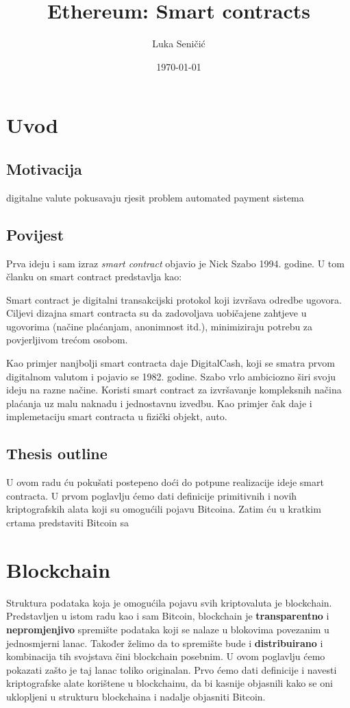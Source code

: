 \documentclass[12pt]{report}
\title{Ethereum: Smart contracts}
\author{Luka Seničić}
\date{\today}
\begin{document}
\maketitle

\tableofcontents

\chapter{Uvod}
\section{Motivacija}
digitalne valute pokusavaju rjesit problem automated payment sistema

\section{Povijest}
Prva ideju i sam izraz \emph{smart contract} objavio je Nick Szabo 1994. godine\cite{smart_contract_idea}. U tom članku on smart contract predstavlja kao:
\begin{definicija}
Smart contract je digitalni transakcijski protokol koji izvršava odredbe ugovora. Ciljevi dizajna smart contracta su da zadovoljava uobičajene zahtjeve u ugovorima (načine plaćanjam, anonimnost itd.), minimiziraju potrebu za povjerljivom trećom osobom.
\end{definicija}
Kao primjer nanjbolji smart contracta daje DigitalCash, koji se smatra prvom digitalnom valutom i pojavio se 1982. godine\cite{digi_cash}. Szabo vrlo ambiciozno širi svoju ideju na razne načine. Koristi smart contract za izvršavanje kompleksnih načina plaćanja uz malu naknadu i jednostavnu izvedbu. Kao primjer čak daje i implemetaciju smart contracta u fizički objekt, auto.

\section{Thesis outline}

U ovom radu ću pokušati postepeno doći do potpune realizacije ideje smart contracta. U prvom poglavlju ćemo dati definicije primitivnih i novih kriptografskih alata koji su omogućili pojavu Bitcoina. Zatim ću u kratkim crtama predstaviti Bitcoin sa 

\chapter{Blockchain}
Struktura podataka koja je omogućila pojavu svih kriptovaluta je blockchain. Predstavljen u istom radu kao i sam Bitcoin\cite{bitcoin}, blockchain je \textbf{transparentno} i \textbf{nepromjenjivo} spremište podataka koji se nalaze u blokovima povezanim u jednosmjerni lanac. Također želimo da to spremište bude i \textbf{distribuirano} i kombinacija tih svojstava čini blockchain posebnim. U ovom poglavlju ćemo pokazati zašto je taj lanac toliko originalan. Prvo ćemo dati definicije i navesti kriptografske alate korištene u blockchainu, da bi kasnije objasnili kako se oni uklopljeni u strukturu blockchaina i nadalje objasniti Bitcoin.
\end{document}
